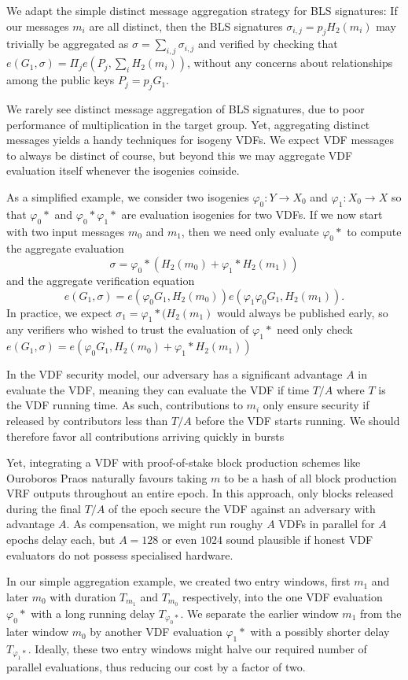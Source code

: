 \documentclass{article}
\newcommand\mathperiod{.}
\begin{document}
We adapt the simple distinct message aggregation strategy for
BLS signatures:  If our messages $m_i$ are all distinct, then the
BLS signatures $\sigma_{i,j} = p_j H_2(m_i)$ may trivially be
aggregated as $\sigma = \sum_{i,j} \sigma_{i,j}$ and verified by
checking that $e(G_1,\sigma) = \Pi_j e(P_j, \sum_i H_2(m_i))$,
without any concerns about relationships among the public keys
$P_j = p_j G_1$.  

We rarely see distinct message aggregation of BLS signatures, due to
poor performance of multiplication in the target group.  
Yet, aggregating distinct messages yields a handy techniques for
isogeny VDFs.  We expect VDF messages to always be distinct of course,
but beyond this we may aggregate VDF evaluation itself whenever the
isogenies coinside.

As a simplified example,
we consider two isogenies $φ_0 : Y \to X_0$ and $φ_1 : X_0 \to X$
so that $φ_0*$ and $φ_0* φ_1*$ are evaluation isogenies for  %
two VDFs.  If we now start with two input messages $m_0$ and $m_1$,
then we need only evaluate $φ_0*$ to compute the aggregate evaluation
$$ \sigma = φ_0*( H_2(m_0) + φ_1* H_2(m_1) )$$
and the aggregate verification equation
$$ e(G_1,\sigma) = e(φ_0 G_1, H_2(m_0)) e(φ_1 φ_0 G_1, H_2(m_1)) \mathperiod $$
In practice, we expect $\sigma_1 = φ_1*(H_2(m_1)$ would always be
published early, so any verifiers who wished to trust the evaluation
of $φ_1*$ need only check 
$e(G_1,\sigma) = e(φ_0 G_1, H_2(m_0) + φ_1* H_2(m_1))$

In the VDF security model, our adversary has a significant advantage
$A$ in evaluate the VDF, meaning they can evaluate the VDF if time
$T/A$ where $T$ is the VDF running time.  As such, contributions to
$m_i$ only ensure security if released by contributors less than
$T/A$ before the VDF starts running.  We should therefore favor all
contributions arriving quickly in bursts

Yet, integrating a VDF with proof-of-stake block production schemes
like Ouroboros Praos naturally favours taking $m$ to be a hash of
all block production VRF outputs throughout an entire epoch. 
In this approach, only blocks released during the final $T/A$ of the
epoch secure the VDF against an adversary with advantage $A$.
As compensation, we might run roughy $A$ VDFs in parallel for $A$
epochs delay each, but $A = 128$ or even $1024$ sound plausible if
honest VDF evaluators do not possess specialised hardware.

In our simple aggregation example, we created two entry windows,
first $m_1$ and later $m_0$ with duration $T_{m_1}$ and $T_{m_0}$
respectively, into the one VDF evaluation $φ_0*$ with a long running
delay $T_{φ_0*}$.  We separate the earlier window $m_1$ from the later
window $m_0$ by another VDF evaluation $φ_1*$ with a possibly shorter
delay $T_{φ_1*}$.  Ideally, these two entry windows might halve our
required number of parallel evaluations, thus reducing our cost by a
factor of two. 
\end{document}
